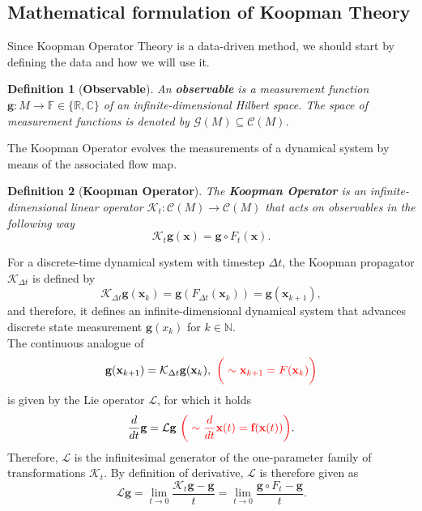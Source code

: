 \documentclass[]{article}
\newtheorem{definition}{Definition}
\begin{document}
\subsection{Mathematical formulation of Koopman Theory}
Since Koopman Operator Theory is a data-driven method, we should start by defining the data and how we will use it.
\begin{definition}[\textbf{Observable}]
An \textbf{observable} is a measurement function $\textbf{g}:M \to \mathbb{F} \in \{\mathbb{R}, \mathbb{C}\}$ of an infinite-dimensional Hilbert space. The space of measurement functions is denoted by $\mathcal{G}(M) \subseteq \mathcal{C}(M)$.
\end{definition}
The Koopman Operator evolves the measurements of a dynamical system by means of the associated flow map.
\begin{definition}[\textbf{Koopman Operator}]
The \textbf{Koopman Operator} is an infinite-dimensional linear operator $\mathcal{K}_t: \mathcal{C}(M) \to \mathcal{C}(M)$ that acts on observables in the following way
\begin{equation}
	\mathcal{K}_t \textbf{g}(\textbf{x}) = \textbf{g} \circ F_t (\textbf{x}).
\end{equation}
\end{definition}
For a discrete-time dynamical system with timestep $\Delta t$, the Koopman propagator $\mathcal{K}_{\Delta t}$ is defined by
\begin{equation}
	\mathcal{K}_{\Delta t} \textbf{g}(\textbf{x}_k) = \textbf{g}(F_{\Delta t}(\textbf{x}_k)) = \textbf{g}(\textbf{x}_{k+1}),
\end{equation}
and therefore, it defines an infinite-dimensional dynamical system that advances discrete state measurement $\textbf{g}(x_k)$ for $k \in \mathbb{N}$. \\
The continuous analogue of 
\begin{equation}
	\textbf{g}(\textbf{x}_{k+1}) = \mathcal{K}_{\Delta t} \textbf{g}(\textbf{x}_k), \,\, \text{$\color{red} \bigg(\sim \textbf{x}_{k+1} = F (\textbf{x}_k)\bigg)$}
\end{equation}
is given by the Lie operator $\mathcal{L}$, for which it holds
\begin{equation}
	\frac{d}{dt} \textbf{g} = \mathcal{L} \textbf{g} \,\, \text{$\color{red} \bigg(\sim \frac{d}{dt} \textbf{x}(t) = \textbf{f}(\textbf{x}(t))\bigg)$}.
\end{equation}
Therefore, $\mathcal{L}$ is the infinitesimal generator of the one-parameter family of transformations $\mathcal{K}_t$. By definition of derivative, $\mathcal{L}$ is therefore given as
\begin{equation}
	\mathcal{L}\textbf{g}=\lim_{t \to 0} \frac{\mathcal{K}_t\textbf{g}-\textbf{g}}{t}=\lim_{t \to 0} \frac{\textbf{g} \circ F_t-\textbf{g}}{t}.
\end{equation}
\end{document}
